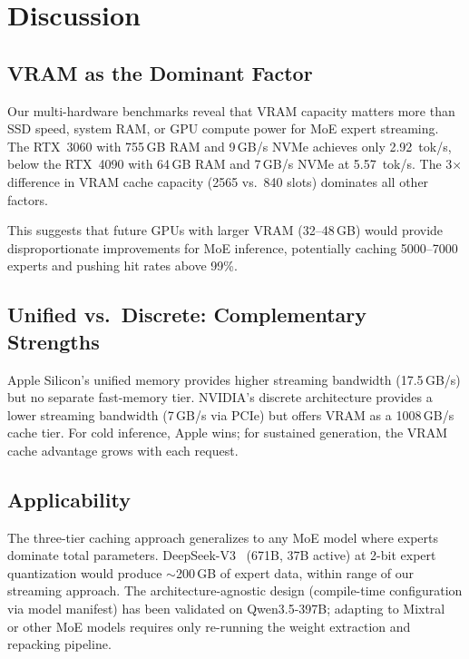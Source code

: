 \documentclass[10pt]{article}
\begin{document}
\section{Discussion}

\subsection{VRAM as the Dominant Factor}

Our multi-hardware benchmarks reveal that VRAM capacity matters more than SSD speed, system RAM, or GPU compute power for MoE expert streaming. The RTX~3060 with 755\,GB RAM and 9\,GB/s NVMe achieves only 2.92~tok/s, below the RTX~4090 with 64\,GB RAM and 7\,GB/s NVMe at 5.57~tok/s. The 3$\times$ difference in VRAM cache capacity (2565 vs.\ 840 slots) dominates all other factors.

This suggests that future GPUs with larger VRAM (32--48\,GB) would provide disproportionate improvements for MoE inference, potentially caching 5000--7000 experts and pushing hit rates above 99\%.

\subsection{Unified vs.\ Discrete: Complementary Strengths}

Apple Silicon's unified memory provides higher streaming bandwidth (17.5\,GB/s) but no separate fast-memory tier. NVIDIA's discrete architecture provides a lower streaming bandwidth (7\,GB/s via PCIe) but offers VRAM as a 1008\,GB/s cache tier. For cold inference, Apple wins; for sustained generation, the VRAM cache advantage grows with each request.

\subsection{Applicability}

The three-tier caching approach generalizes to any MoE model where experts dominate total parameters. DeepSeek-V3~\citep{deepseekv3} (671B, 37B active) at 2-bit expert quantization would produce $\sim$200\,GB of expert data, within range of our streaming approach. The architecture-agnostic design (compile-time configuration via model manifest) has been validated on Qwen3.5-397B; adapting to Mixtral~\citep{mixtral} or other MoE models requires only re-running the weight extraction and repacking pipeline.
\end{document}
